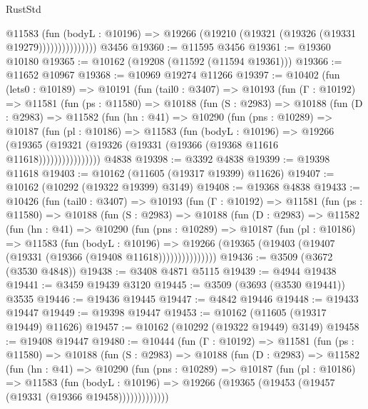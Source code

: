 \begin{lexlean}{RustStd}
\begin{coremodule}
                      @11583
                        (fun (bodyL : @10196) =>
                        @19266 (@19210 (@19321 (@19326 (@19331 @19279)))))))))))))))
    @3456
@19360 := @11595 @3456
@19361 := @19360 @10180
@19365 := @10162 (@19208 (@11592 (@11594 @19361)))
@19366 := @11652 @10967
@19368 := @10969 @19274 @11266
@19397 := @10402
    (fun (lets0 : @10189) =>
    @10191
      (fun (tail0 : @3407) =>
      @10193
        (fun (Γ : @10192) =>
        @11581
          (fun (ps : @11580) =>
          @10188
            (fun (S : @2983) =>
            @10188
              (fun (D : @2983) =>
              @11582
                (fun (hn : @41) =>
                @10290
                  (fun (pns : @10289) =>
                  @10187
                    (fun (pl : @10186) =>
                    @11583
                      (fun (bodyL : @10196) =>
                      @19266
                        (@19365
                          (@19321 (@19326 (@19331 (@19366 (@19368 @11616 @11618))))))))))))))))
    @4838
@19398 := @3392 @4838
@19399 := @19398 @11618
@19403 := @10162 (@11605 (@19317 @19399) @11626)
@19407 := @10162 (@10292 (@19322 @19399) @3149)
@19408 := @19368 @4838
@19433 := @10426
    (fun (tail0 : @3407) =>
    @10193
      (fun (Γ : @10192) =>
      @11581
        (fun (ps : @11580) =>
        @10188
          (fun (S : @2983) =>
          @10188
            (fun (D : @2983) =>
            @11582
              (fun (hn : @41) =>
              @10290
                (fun (pns : @10289) =>
                @10187
                  (fun (pl : @10186) =>
                  @11583
                    (fun (bodyL : @10196) =>
                    @19266 (@19365 (@19403 (@19407 (@19331 (@19366 (@19408 @11618)))))))))))))))
@19436 := @3509 (@3672 (@3530 @4848))
@19438 := @3408 @4871 @5115
@19439 := @4944 @19438
@19441 := @3459 @19439 @3120
@19445 := @3509 (@3693 (@3530 @19441)) @3535
@19446 := @19436 @19445
@19447 := @4842 @19446
@19448 := @19433 @19447
@19449 := @19398 @19447
@19453 := @10162 (@11605 (@19317 @19449) @11626)
@19457 := @10162 (@10292 (@19322 @19449) @3149)
@19458 := @19408 @19447
@19480 := @10444
    (fun (Γ : @10192) =>
    @11581
      (fun (ps : @11580) =>
      @10188
        (fun (S : @2983) =>
        @10188
          (fun (D : @2983) =>
          @11582
            (fun (hn : @41) =>
            @10290
              (fun (pns : @10289) =>
              @10187
                (fun (pl : @10186) =>
                @11583
                  (fun (bodyL : @10196) =>
                  @19266 (@19365 (@19453 (@19457 (@19331 (@19366 @19458)))))))))))))

\end{coremodule}
\end{lexlean}
